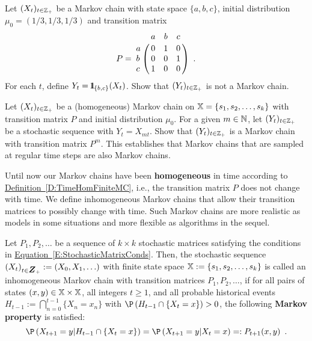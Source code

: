 \begin{exercise}\label{Exr:NonMarkovProjection1}
Let $(X_t)_{t\in\mathbb{Z}_+}$ be a Markov chain with state space $\{a,b,c\}$, initial distribution $\mu_0=(1/3,1/3,1/3)$ and transition matrix 
$$P = 
\bordermatrix{~ & a & b & c \cr
a & 0 & 1 & 0\cr
b & 0 & 0 & 1\cr
c & 1 & 0 & 0} \enspace .
$$
For each $t$, define $Y_t = {1}\mspace{-11 mu}{1}_{\{b,c\}}(X_t)$.  Show that $(Y_t)_{t\in\mathbb{Z}_+}$ is not a Markov chain.
\end{exercise}

\begin{exercise}\label{Exr:RegularSampledChainIsMarkov}
Let $(X_t)_{t\in\mathbb{Z}_+}$ be a (homogeneous) Markov chain on $\mathbb{X}=\{s_1,s_2,\ldots,s_k\}$ with transition matrix $P$ and initial distribution $\mu_0$.  For a given $m \in \mathbb{N}$, let $(Y_t)_{t\in\mathbb{Z}_+}$ be a stochastic sequence with $Y_t = X_{mt}$.  Show that $(Y_t)_{t\in\mathbb{Z}_+}$ is a Markov chain with transition matrix $P^m$.  This establishes that Markov chains that are sampled at regular time steps are also Markov chains.
\end{exercise}


Until now our Markov chains have been {\bf  homogeneous} in time according to \hyperref[D:TimeHomFiniteMC]{Definition~\ref*{D:TimeHomFiniteMC}}, i.e., the transition matrix $P$ does not change with time.  We define inhomogeneous Markov chains that allow their transition matrices to possibly change with time.  Such Markov chains are more realistic as models in some situations and more flexible as algorithms in the sequel.

\begin{definition}\label{D:TimeInhomFiniteMC}
Let $P_1,P_2,\ldots$ be a sequence of $k \times k$ stochastic matrices satisfying the conditions in \hyperref[E:StochasticMatrixConds]{Equation~\ref*{E:StochasticMatrixConds}}.  Then, the stochastic sequence $\left( X_t \right)_{t \in \Z_+} := (X_0,X_1,\ldots)$ with finite state space $\mathbb{X} := \{s_1,s_2,\ldots,s_k\}$ is called an inhomogeneous Markov chain with transition matrices $P_1,P_2,\ldots$, if for all pairs of states $(x,y) \in \mathbb{X} \times \mathbb{X}$, all integers $t \geq 1$, and all probable historical events $H_{t-1} := \bigcap_{n=0}^{t-1} \{ X_n = x_n \}$ with $\P\left(H_{t-1} \cap \{X_t = x\} \right) > 0$, the following {\bf Markov property} is satisfied: 
\begin{equation}\label{E:InHomFiniteMarkovProperty}
\P\left(X_{t+1} = y | H_{t-1} \cap \{X_t = x\} \right)=\P\left(X_{t+1} = y | X_t = x \right) =: P_{t+1}(x,y) \enspace .
\end{equation}
\end{definition}

